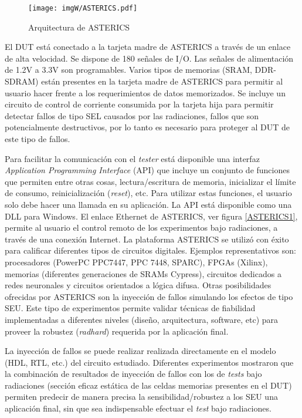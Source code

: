 \documentclass[a4paper,openright,12pt]{report}
\begin{document}
\begin{figure}[H]
	\centering
	\texttt{[image: imgW/ASTERICS.pdf]}
	\caption{Arquitectura de ASTERICS}
	\label{ASTERICS2}
\end{figure}

El DUT está conectado a la tarjeta madre de ASTERICS a través de un enlace de alta velocidad.  Se dispone de 180 señales de I/O. Las señales de alimentación de 1.2V a 3.3V son programables. Varios tipos de memorias (SRAM, DDR-SDRAM) están  presentes en la tarjeta madre de ASTERICS para permitir al usuario hacer frente a los requerimientos de datos memorizados. Se incluye un circuito de control de corriente consumida por la tarjeta hija  para permitir detectar fallos de tipo SEL   causados por las radiaciones, fallos que son potencialmente destructivos, por lo tanto es necesario para proteger al DUT de este tipo de fallos.  

 Para facilitar la comunicación con el \textit{tester} está disponible una interfaz \textit{Application Programming Interface} (API) que incluye un conjunto de funciones que permiten entre otras cosas, lectura/escritura de memoria, inicializar  el límite de consumo, reinicialización (\textit{reset}), etc. Para utilizar estas funciones, el usuario solo debe hacer una llamada en su aplicación. La API está disponible como una DLL para Windows. 
El enlace Ethernet de ASTERICS, ver figura \ref{ASTERICS1}, permite al usuario el control remoto de los experimentos bajo radiaciones, a través de una conexión Internet. 
La plataforma ASTERICS se utilizó con éxito para calificar diferentes tipos de circuitos digitales. Ejemplos representativos son: procesadores (PowerPC PPC7447, PPC 7448, SPARC), FPGAs (Xilinx), memorias (diferentes generaciones de SRAMs Cypress), circuitos dedicados a redes neuronales y circuitos orientados a lógica difusa. 
Otras posibilidades ofrecidas por ASTERICS son la inyección de fallos simulando los efectos de tipo SEU. Este tipo de experimentos permite validar técnicas de fiabilidad implementadas a diferentes niveles (diseño, arquitectura, software, etc)  para proveer la robustez (\textit{radhard}) requerida por la aplicación final. 

La inyección de fallos se puede realizar realizada directamente en el modelo (HDL, RTL, etc.) del circuito estudiado. Diferentes experimentos  mostraron que la combinación de resultados de inyección de fallos con los de \textit{tests} bajo radiaciones (sección eficaz estática de las celdas memorias presentes en el DUT) permiten predecir de manera precisa la sensibilidad/robustez a los SEU una aplicación final, sin que sea indispensable efectuar el \textit{test} bajo radiaciones. 
\end{document}
